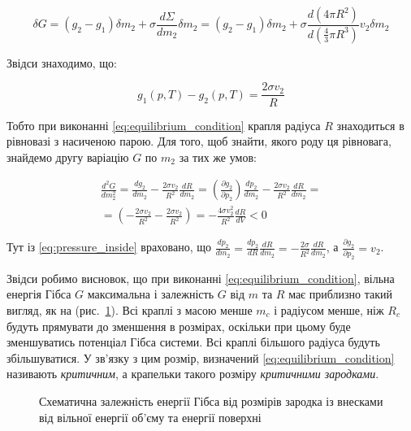 \begin{equation}\label{eq:variation_m2}
\delta G = (g_2 - g_1)\delta m_2 + \sigma\frac{d\Sigma}{dm_2}\delta m_2 = (g_2 - g_1)\delta m_2 +
\sigma\frac{d(4\pi R^2)}{d(\frac{4}{3}\pi R^3)}v_2\delta m_2
\end{equation}

Звідси знаходимо, що:

\begin{equation}\label{eq:equilibrium_condition}
g_1(p,T) - g_2(p,T) = \frac{2\sigma v_2}{R}
\end{equation}

Тобто при виконанні \eqref{eq:equilibrium_condition} крапля радіуса $R$ знаходиться в рівновазі з
насиченою парою. Для того, щоб знайти, якого роду ця рівновага, знайдемо
другу варіацію $G$ по $m_2$ за тих же умов:

\begin{multline}\label{eq:second_variation}
\frac{d^2G}{dm_2^2} = \frac{dg_2}{dm_2} - \frac{2\sigma v_2}{R^2}\frac{dR}{dm_2} = \left(
\frac{\partial g_2}{\partial p_2} \right)\frac{dp_2}{dm_2} - \frac{2\sigma v_2}{R^2}\frac{dR}{dm_2} = \\ =
\left( - \frac{2\sigma v_2}{R^2} - \frac{2\sigma v_2}{R^2} \right) = - \frac{4\sigma
v_2^2}{R^2}\frac{dR}{dV} < 0
\end{multline}

Тут із \eqref{eq:pressure_inside} враховано, що
$\frac{dp_2}{dm_2} = \frac{dp_2}{dR}\frac{dR}{dm_2} = - \frac{2\sigma}{R^2}\frac{dR}{dm_2}$,
а $\frac{\partial g_2}{\partial p_2} = v_2$.

Звідси робимо висновок, що при виконанні \eqref{eq:equilibrium_condition}, вільна енергія Гібса $G$
максимальна і залежність $G$ від $m$ та $R$ має приблизно такий вигляд,
як на (рис.~\ref{fig:gibbs_energy}). Всі краплі з масою менше $m_c$ і радіусом менше, ніж
$R_c$ будуть прямувати до зменшення в розмірах, оскільки при цьому буде
зменшуватись потенціал Гібса системи. Всі краплі більшого радіуса будуть
збільшуватися. У зв'язку з цим розмір, визначений \eqref{eq:equilibrium_condition} називають
\emph{критичним}, а крапельки такого розміру \emph{критичними зародками}.

\begin{figure}[h]
\centering

\caption{Схематична залежність енергії Гібса від розмірів зародка із внесками від вільної енергії
об'єму та енергії поверхні}
\label{fig:gibbs_energy}
\end{figure}

